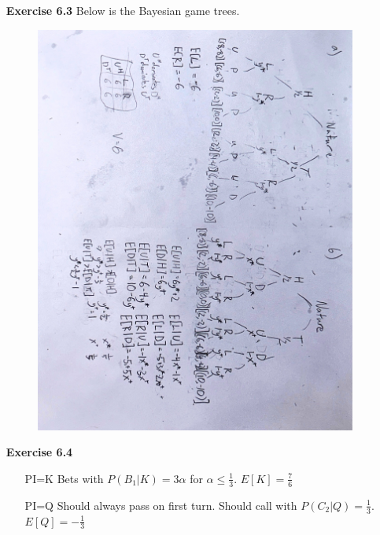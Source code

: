 \documentclass[10pt]{article}[H]
\begin{document}
\begin{itemize}
\begin{table}[H]
\begin{tabular}{llll}
                               &                         &                                                       &                             \\
                               &                         &                                                       &                            
        \end{tabular}
        \end{table}
    \item [\textbf{Exercise 6.3}] Below is the Bayesian game trees.
    \begin{figure}[H]
        \includegraphics[scale=0.1, angle=90]{Tree_2.pdf}    
    \end{figure} 
    \item [\textbf{Exercise 6.4}] \begin{itemize}
        \item [PI=K] Bets with $P(B_1|K)=3\alpha$ for $\alpha\le\frac{1}{3}$. $E[K]=\frac{7}{6}$
        \item [PI=Q] Should always pass on first turn. Should call with $P(C_2|Q)=\frac{1}{3}$. $E[Q]=-\frac{1}{3}$

\end{itemize}
\end{itemize}
\end{document}
